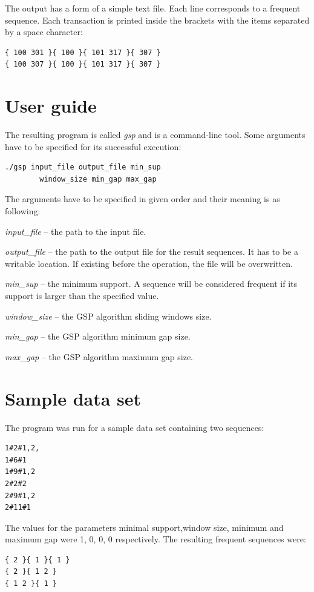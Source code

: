 \documentclass[journal,a4paper]{IEEEtran}
\newenvironment{my_itemize}{
\begin{itemize}
  \setlength{\itemsep}{4pt}
  \setlength{\parskip}{1pt}
  \setlength{\parsep}{4pt}}
{\end{itemize}
}
\begin{document}
The output has a form of a simple text file. Each line corresponds to a frequent sequence. Each transaction is printed inside the brackets with the items separated by a space character:
\begin{verbatim}
{ 100 301 }{ 100 }{ 101 317 }{ 307 }
{ 100 307 }{ 100 }{ 101 317 }{ 307 }
\end{verbatim}

\section{User guide}

The resulting program is called \emph{gsp} and is a command-line tool. Some arguments have to be specified for its successful execution:
\begin{verbatim}
./gsp input_file output_file min_sup 
        window_size min_gap max_gap
\end{verbatim}

The arguments have to be specified in given order and their meaning is as following:
\begin{my_itemize}
\item \emph{input\_file} -- the path to the input file.
\item \emph{output\_file} -- the path to the output file for the result sequences. It has to be a writable location. If existing before the operation, the file will be overwritten.
\item \emph{min\_sup} -- the minimum support. A sequence will be considered frequent if its support is larger than the specified value.
\item \emph{window\_size} -- the GSP algorithm sliding windows size.
\item \emph{min\_gap} -- the GSP algorithm minimum gap size.
\item \emph{max\_gap} -- the GSP algorithm maximum gap size.
\end{my_itemize}

\section{Sample data set}

The program was run for a sample data set containing two sequences:
\begin{verbatim}
1#2#1,2,
1#6#1
1#9#1,2
2#2#2
2#9#1,2
2#11#1
\end{verbatim}

The values for the parameters minimal support,window size, minimum and maximum gap were 1, 0, 0, 0 respectively. The resulting frequent sequences were:
\begin{verbatim}
{ 2 }{ 1 }{ 1 }
{ 2 }{ 1 2 }
{ 1 2 }{ 1 }
\end{verbatim}
\end{document}
